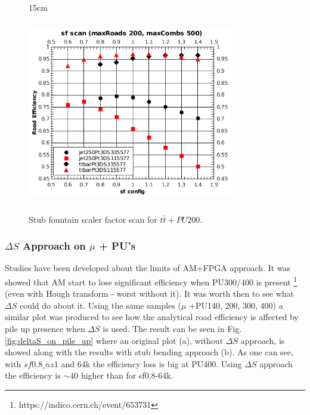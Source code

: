 \begin{figure}[htbp]{15cm}
	\caption{Stub fountain scaler factor scan for $t\bar{t}+PU200$.}
	\centering
	\includegraphics[width=9cm,height=8cm]{AppendixCMSL1TT/figs/sf_scans_with_DS_maxRoads200_maxCombs500}
	\label{fig:deltaS_sf_scan}	
\end{figure}


\subsubsection{$\Delta S$ Approach on $\mu$ + PU's}
Studies have been developed about the limits of AM+FPGA approach. It was showed that AM start to lose significant efficiency when PU300/400 is present \footnote{https://indico.cern.ch/event/653731} (even with Hough transform - worst without it). It was worth then to see what $\Delta S$ could do about it. Using the same samples ($\mu$ +PU140, 200, 300, 400) a similar plot was produced to see how the analytical road efficiency is affected by pile up presence when $\Delta S$ is used. The result can be seen in Fig.\ref{fig:deltaS_on_pile_up} where an original plot (a), without $\Delta S$ approach, is showed along with the results with stub bending approach (b). As one can see, with $sf0.8\_nz1$ and 64k the efficiency loss is big at PU400. Using $\Delta S$ approach the efficiency is $\sim40$ higher than for sf0.8-64k.

